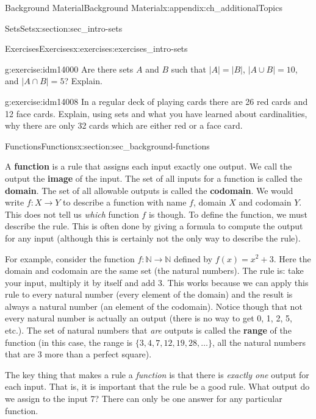 \documentclass[oneside,10pt,]{book}
\newcommand{\terminology}[1]{\textbf{#1}}
\numberwithin{equation}{chapter}
\def\N{\mathbb N}
\begin{document}
\begin{appendixptx}{Background Material}{}{Background Material}{}{}{x:appendix:ch_additionalTopics}
\begin{sectionptx}{Sets}{}{Sets}{}{}{x:section:sec_intro-sets}
\begin{exercises-subsection}{Exercises}{}{Exercises}{}{}{x:exercises:exercises_intro-sets}
\begin{divisionexercise}{15}{}{}{g:exercise:idm14000}
Are there sets \(A\) and \(B\) such that \(|A| = |B|\), \(|A\cup B| = 10\), and \(|A\cap B| = 5\)? Explain.%
\end{divisionexercise}%
\begin{divisionexercise}{16}{}{}{g:exercise:idm14008}%
In a regular deck of playing cards there are 26 red cards and 12 face cards. Explain, using sets and what you have learned about cardinalities, why there are only 32 cards which are either red or a face card.%
\end{divisionexercise}%
\end{exercises-subsection}
\end{sectionptx}
%
%
\typeout{************************************************}
\typeout{************************************************}
%
\begin{sectionptx}{Functions}{}{Functions}{}{}{x:section:sec_background-functions}
\(\textit{}\)\begin{introduction}{}%
A \terminology{function} is a rule that assigns each input exactly one output.  We call the output the \terminology{image} of the input.  The set of all inputs for a function is called the \terminology{domain}. The set of all allowable outputs is called the \terminology{codomain}. We would write \(f:X \to Y\) to describe a function with name \(f\), domain \(X\) and codomain \(Y\). This does not tell us \emph{which} function \(f\) is though. To define the function, we must describe the rule. This is often done by giving a formula to compute the output for any input (although this is certainly not the only way to describe the rule).%
\par
For example, consider the function \(f:\N \to \N\) defined by \(f(x) = x^2 + 3\). Here the domain and codomain are the same set (the natural numbers). The rule is: take your input, multiply it by itself and add 3. This works because we can apply this rule to every natural number (every element of the domain) and the result is always a natural number (an element of the codomain). Notice though that not every natural number is actually an output (there is no way to get 0, 1, 2, 5, etc.). The set of natural numbers that \emph{are} outputs is called the \terminology{range} of the function (in this case, the range is \(\{3, 4, 7, 12, 19, 28, \ldots\}\), all the natural numbers that are 3 more than a perfect square).%
\par
The key thing that makes a rule a \emph{function} is that there is \emph{exactly one} output for each input. That is, it is important that the rule be a good rule. What output do we assign to the input 7? There can only be one answer for any particular function.%

\end{introduction}
\end{sectionptx}
\end{appendixptx}
\end{document}

